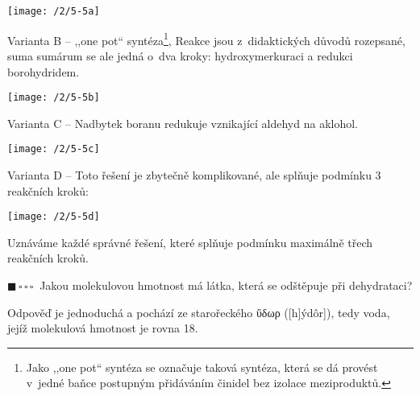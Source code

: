 \documentclass{book}
\newcommand{\jeden}{$\blacksquare \, \square \, \square \, \square \; \; $}
\renewenvironment{quotation}{\par}{\par} %
\begin{document}
\begin{center}
\texttt{[image: /2/5-5a]}
\end{center}

Varianta B -- ,,one pot`` syntéza\footnote{Jako ,,one pot`` syntéza se označuje taková syntéza, která se dá provést v~jedné baňce postupným přidáváním činidel bez izolace meziproduktů.}, Reakce jsou z~didaktických důvodů rozepsané, suma sumárum se ale jedná o~dva kroky: hydroxymerkuraci a redukci borohydridem.

\begin{center}
\texttt{[image: /2/5-5b]}
\end{center}

Varianta C -- Nadbytek boranu redukuje vznikající aldehyd na aklohol.

\begin{center}
\texttt{[image: /2/5-5c]}
\end{center}

Varianta D -- Toto řešení je zbytečně komplikované, ale splňuje podmínku 3 reakčních kroků:

\begin{center}
\texttt{[image: /2/5-5d]}
\end{center}

Uznáváme každé správné řešení, které splňuje podmínku maximálně třech reakčních kroků. 

\newpage %
\begin{quotation}
\jeden Jakou molekulovou hmotnost má látka, která se odštěpuje při dehydrataci?
\end{quotation} \dotfill \par 
Odpověď je jednoduchá a pochází ze starořeckého \foreignlanguage{greek}{ὕδωρ} ({[}h{]}ýdôr{]}), tedy voda, jejíž molekulová hmotnost je rovna
18.
\end{document}
